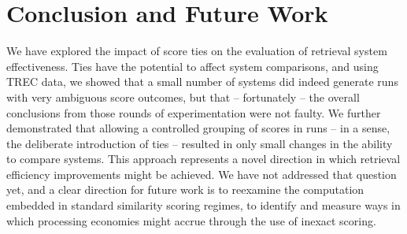 \section{Conclusion and Future Work}
\label{sec-conclusion}

We have explored the impact of score ties on the evaluation of
retrieval system effectiveness.
Ties have the potential to affect system comparisons, and using TREC
data, we showed that a small number of systems did indeed generate
runs with very ambiguous score outcomes, but that -- fortunately --
the overall conclusions from those rounds of experimentation were not
faulty.
We further demonstrated that allowing a controlled grouping of scores
in runs -- in a sense, the deliberate introduction of ties --
resulted in only small changes in the ability to compare systems.
This approach represents a novel direction in which retrieval
efficiency improvements might be achieved.
We have not addressed that question yet, and a clear direction for
future work is to reexamine the computation embedded in standard
similarity scoring regimes, to identify and measure ways in which
processing economies might accrue through the use of inexact scoring.


